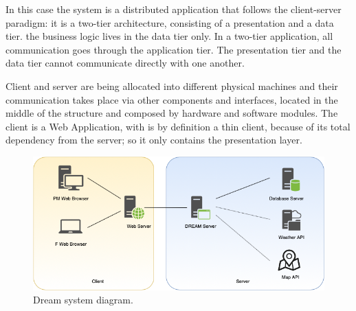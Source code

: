 In this case the system is a distributed application that follows the client-server paradigm: it is a two-tier architecture, consisting of a presentation and a data tier. the business logic lives in the data tier only.
In a two-tier application, all communication goes through the application tier. The presentation tier and the data tier cannot communicate directly with one another. 

Client and server are being allocated into different physical machines and their communication takes place via other components and interfaces, located in the middle of the structure and composed by hardware and software modules. 
The client is a Web Application, with is by definition a thin client, because of its total dependency from the server; so it only contains the presentation layer.

\begin{figure}[H]
    \begin{center}
    \includegraphics[width=1.2\textwidth]{images/System diagram.png}
    \caption{Dream system diagram.}
    \label{fig:system diagram}
    \end{center}
\end{figure}

